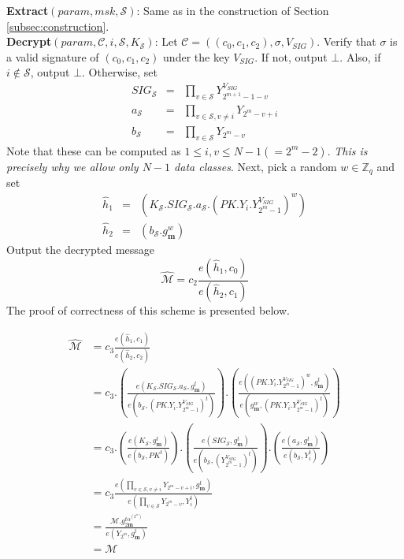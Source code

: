 \noindent \textbf{Extract}$(param,msk,\mathcal{S})$: Same as in the construction of Section \ref{subsec:construction}.\\
 
\noindent \textbf{Decrypt}$(param,\mathcal{C},i,\mathcal{S},K_{\mathcal{S}})$: Let $\mathcal{C}=((c_0,c_1,c_2),\sigma,V_{SIG})$. Verify that $\sigma$ is a valid signature of $(c_0,c_1,c_2)$ under the key $V_{SIG}$. If not, output $\bot$. Also, if $i\notin\mathcal{S}$, output $\bot$. Otherwise, set 
\begin{eqnarray}
  SIG_{\mathcal{S}} &=& \prod_{v\in\mathcal{S}}Y^{V_{SIG}}_{2^{m+1}-1-v}\nonumber\\
  a_{\mathcal{S}} &=& \prod_{v\in\mathcal{S},v\neq i}Y_{2^m-v+i}\nonumber\\
  b_{\mathcal{S}} &=& \prod_{v\in\mathcal{S}}Y_{2^m-v}\nonumber  
\end{eqnarray}
\noindent Note that these can be computed as $1\leq i,v \leq N-1(=2^m-2)$. \emph{This is precisely why we allow only $N-1$ data classes}.  Next, pick a random $w\in \mathbb{Z}_q$ and set
 \begin{eqnarray}
  \hat{h}_1 &=& (K_{\mathcal{S}}.SIG_{\mathcal{S}}.a_{\mathcal{S}}.(PK.Y_i.Y^{V_{SIG}}_{2^m-1})^w)\nonumber\\
  \hat{h}_2 &=& (b_{\mathcal{S}}.g^w_{\mathbf{m}}) \nonumber
 \end{eqnarray}
 \noindent Output the decrypted message 
 \begin{equation}
  \hat{\mathcal{M}} = c_2\frac{{e}(\hat{h}_1,c_0)}{{e}(\hat{h}_2,c_1)}\nonumber
 \end{equation}
\noindent The proof of correctness of this scheme is presented below.

\begin{equation}
\begin{split}
 \hat{\mathcal{M}} &= c_3\frac{{e}(\hat{h}_1,c_1)}{{e}(\hat{h}_2,c_2)}\\
 &= c_3.\left(\frac{e\left(K_{\mathcal{S}}.SIG_{\mathcal{S}}.a_{\mathcal{S}},g^{t}_{\mathbf{m}}\right)}{e\left(b_{\mathcal{S}},(PK.Y_i.Y^{V_{SIG}}_{2^m-1})^{t}\right)}\right).\left(\frac{e\left(\left(PK.Y_i.Y^{V_{SIG}}_{2^m-1}\right)^w,g^{t}_{\mathbf{m}}\right)}{e\left(g^w_{\mathbf{m}},(PK.Y_i.Y^{V_{SIG}}_{2^m-1})^{t}\right)}\right)\\
 &=c_3.\left(\frac{e\left(K_{\mathcal{S}},g^{t}_{\mathbf{m}}\right)}{e\left(b_{\mathcal{S}},PK^{t}\right)}\right).\left(\frac{e\left(SIG_{\mathcal{S}},g^{t}_{\mathbf{m}}\right)}{e\left(b_{\mathcal{S}},\left(Y^{V_{SIG}}_{2^m-1}\right)^{t}\right)}\right).\left(\frac{e\left(a_{\mathcal{S}},g^{t}_{\mathbf{m}}\right)}{e\left(b_{\mathcal{S}},Y^{t}_i\right)}\right)\\
 &=c_3\frac{e(\prod_{v\in\mathcal{S},v\neq i}Y_{2^m-v+i},g^{t}_{\mathbf{m}})}{e(\prod_{v\in\mathcal{S}}Y_{2^m-v},Y_i^{t})}\\
 &=\frac{\mathcal{M}.g^{t\alpha^{(2^m)}}_{2\mathbf{m}}}{e(Y_{2^m},g^{t}_{\mathbf{m}})}\\
 &=\mathcal{M}\nonumber
\end{split}
\end{equation}

